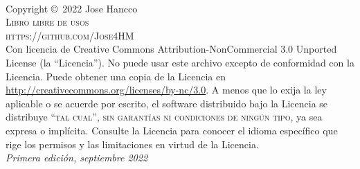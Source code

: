 \documentclass[
	12pt, %
	fleqn, %
	a4paper, %
	oneside, %
]{LegrandOrangeBook}
\begin{document}

\begingroup
\thispagestyle{empty} %
\vfill
\endgroup


\newpage
~\vfill
\thispagestyle{empty}

\noindent Copyright \copyright\ 2022 Jose Hancco\\ %

\noindent \textsc{Libro libre de usos}\\ %

\noindent \textsc{https://github.com/Jose4HM}\\ %

\noindent Con licencia de Creative Commons Attribution-NonCommercial 3.0 Unported License (la ``Licencia''). No puede usar este archivo excepto de conformidad con la Licencia. Puede obtener una copia de la Licencia en \url{http://creativecommons.org/licenses/by-nc/3.0}. A menos que lo exija la ley aplicable o se acuerde por escrito, el software distribuido bajo la Licencia se distribuye \textsc{``tal cual'', sin garantías ni condiciones de ningún tipo}, ya sea expresa o implícita. Consulte la Licencia para conocer el idioma específico que rige los permisos y las limitaciones en virtud de la Licencia.\\ %

\noindent \textit{Primera edición, septiembre 2022} %
\end{document}
